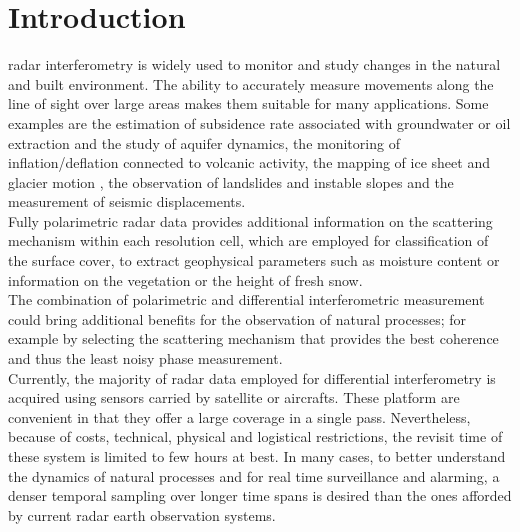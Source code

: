 \section{Introduction}
 radar interferometry\cite{Gabriel1989, Massonnet1993,Rosen2000,Bamler1999} is widely used  to monitor and study changes in the natural and built environment. The ability to accurately measure movements along the line of sight over large areas makes them suitable for many  applications. Some examples are the estimation of subsidence rate associated with groundwater or oil extraction and the study of aquifer dynamics\cite{Hudnut1998,Strozzi2001,Galloway2007a}, the monitoring of inflation/deflation connected to volcanic activity\cite{Massonnet1995}, the mapping of ice sheet and glacier motion\cite{Goldstein1993,Mohr1998} , the observation of landslides and instable slopes\cite{Carnec1996,Catani2005} and the measurement of seismic displacements\cite{Massonnet1993b,Zebker1994}.\\
Fully polarimetric radar data provides additional information on the scattering mechanism within each resolution cell, which are employed for classification of the surface cover\cite{Cloude1997, Lee1999}, to extract geophysical parameters such as moisture content\cite{Hajnsek2003} or information on the vegetation \cite{Ulaby1987} or the height of fresh snow\cite{Leinss2014}.\\
The combination of polarimetric and differential interferometric measurement could bring additional benefits for the observation of natural processes; for example by selecting the scattering mechanism that provides the best coherence and thus the least noisy phase measurement\cite{Pipia2009a, Iglesias2014b}.\\
Currently, the majority of radar data employed for differential interferometry is acquired using sensors carried by satellite or aircrafts. These platform are convenient in that they offer a large coverage in a single pass. Nevertheless, because of costs, technical, physical and logistical restrictions, the revisit time of these system is limited to few hours at best. 
In many cases, to better understand the dynamics of natural processes and for real time surveillance and alarming, a denser temporal sampling over longer time spans is desired than the ones afforded by current radar earth observation systems.\\
